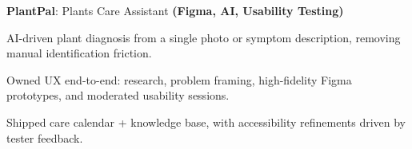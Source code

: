 \begin{twocolentry}{}{}
\textbf{PlantPal}: Plants Care Assistant \textbf{(Figma, AI, Usability Testing)}
\end{twocolentry}
\begin{onecolentry}
\begin{highlights}
\item AI-driven plant diagnosis from a single photo or symptom description, removing manual identification friction.
\item Owned UX end-to-end: research, problem framing, high-fidelity Figma prototypes, and moderated usability sessions.
\item Shipped care calendar + knowledge base, with accessibility refinements driven by tester feedback.
\end{highlights}
\end{onecolentry}